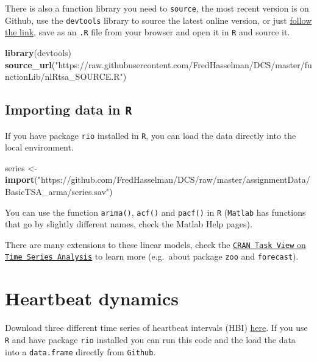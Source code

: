 \documentclass[]{book}
\newenvironment{Shaded}{\begin{snugshade}}{\end{snugshade}}
\newcommand{\KeywordTok}[1]{\textcolor[rgb]{0.13,0.29,0.53}{\textbf{{#1}}}}
\newcommand{\StringTok}[1]{\textcolor[rgb]{0.31,0.60,0.02}{{#1}}}
\newcommand{\NormalTok}[1]{{#1}}
\let\stdsection\section
\renewcommand\section{\newpage\stdsection}
\begin{document}
There is also a function library you need to \texttt{source}, the most
recent version is on Github, use the \texttt{devtools} library to source
the latest online version, or just
\href{https://raw.githubusercontent.com/FredHasselman/DCS/master/functionLib/nlRtsa_SOURCE.R}{follow
the link}, save as an \texttt{.R} file from your browser and open it in
\texttt{R} and source it.

\begin{Shaded}
\begin{Highlighting}[]
\KeywordTok{library}\NormalTok{(devtools)}
\KeywordTok{source_url}\NormalTok{(}\StringTok{"https://raw.githubusercontent.com/FredHasselman/DCS/master/functionLib/nlRtsa_SOURCE.R"}\NormalTok{)}
\end{Highlighting}
\end{Shaded}

\subsection{\texorpdfstring{Importing data in
\texttt{R}}{Importing data in R}}\label{importing-data-in-r}

If you have package \texttt{rio} installed in \texttt{R}, you can load
the data directly into the local environment.

\begin{Shaded}
\begin{Highlighting}[]
\NormalTok{series <-}\StringTok{ }\KeywordTok{import}\NormalTok{(}\StringTok{"https://github.com/FredHasselman/DCS/raw/master/assignmentData/BasicTSA_arma/series.sav"}\NormalTok{)}
\end{Highlighting}
\end{Shaded}

You can use the function \texttt{arima()}, \texttt{acf()} and
\texttt{pacf()} in \texttt{R} (\texttt{Matlab} has functions that go by
slightly different names, check the Matlab Help pages).

There are many extensions to these linear models, check the
\href{https://cran.r-project.org/web/views/TimeSeries.html}{\texttt{CRAN\ Task\ View}
on \texttt{Time\ Series\ Analysis}} to learn more (e.g.~about package
\texttt{zoo} and \texttt{forecast}).

\section{Heartbeat dynamics}\label{heartbeat-dynamics}

Download three different time series of heartbeat intervals (HBI)
\href{https://github.com/FredHasselman/DCS/tree/master/assignmentData/RelativeRoughness}{here}.
If you use \texttt{R} and have package \texttt{rio} installed you can
run this code and the load the data into a \texttt{data.frame} directly
from \texttt{Github}.
\end{document}
